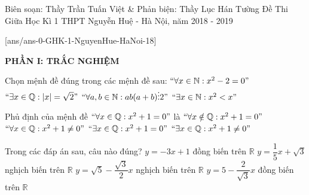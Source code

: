 \begin{name}
{Biên soạn: Thầy Trần Tuấn Việt \& Phản biện: Thầy Lục Hán Tường}
{Đề Thi Giữa Học Kì 1 THPT Nguyễn Huệ - Hà Nội, năm 2018 - 2019}
\end{name}

\setcounter{ex}{0}\setcounter{bt}{0}
[ans/ans-0-GHK-1-NguyenHue-HaNoi-18]

\noindent \textbf{PHẦN I: TRẮC NGHIỆM}

\begin{ex}%
Chọn mệnh đề đúng trong các mệnh đề sau:
	\choice
	{$``\forall x \in \mathbb{N}: x^2 - 2 = 0"$}
	{$``\exists x \in \mathbb{Q}: \left| x \right| = \sqrt{2}"$}
	{\True $``\forall a, b \in \mathbb{N}: ab(a + b) \vdots  2"$}
	{$``\exists x \in \mathbb{N}: x^2 < x"$}
\end{ex}

\begin{ex}%
Phủ định của mệnh đề $``\forall x \in \mathbb{Q}: x^2 + 1 = 0"$ là
	\choice
	{$``\forall x \notin \mathbb{Q}: x^2 + 1 = 0"$}
	{$``\forall x \in \mathbb{Q}: x^2 + 1 \neq 0"$}
	{$``\exists x \in \mathbb{Q}: x^2 + 1 = 0"$}
	{\True $``\exists x \in \mathbb{Q}: x^2 + 1 \neq 0"$}
\end{ex}

\begin{ex}%
Trong các đáp án sau, câu nào đúng?
	\choice
	{$y = -3x + 1$ đồng biến trên $\mathbb{R}$}
	{$y = \dfrac{1}{5}x + \sqrt{3}$ nghịch biến trên $\mathbb{R}$}
	{\True $y = \sqrt{5} - \dfrac{\sqrt{3}}{2} x$ nghịch biến trên $\mathbb{R}$}
	{$y = 5 - \dfrac{2}{\sqrt{3}}x$ đồng biến trên $\mathbb{R}$}
\end{ex}

